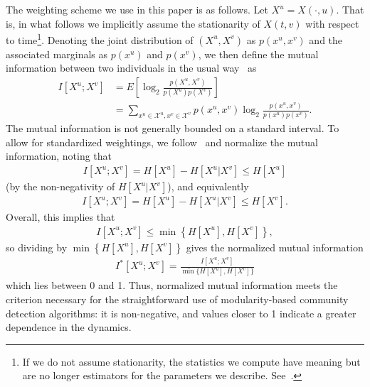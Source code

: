 \documentclass[12pt]{article}
\begin{document}
The weighting scheme we use in this paper is as follows. Let $X^{u} = X(\cdot, u).$ That is, in what follows we implicitly assume the stationarity of $X(t, v)$ with respect to time\footnote{If we do not assume stationarity, the statistics we compute have meaning but are no longer estimators for the parameters we describe. See~\cite{vu2009information}.}. Denoting the joint distribution of $(X^{u}, X^{v})$ as $p(x^{u}, x^{v})$ and the associated marginals as $p(x^{u})$ and $p(x^{v})$, we then define the mutual information between two individuals in the usual way~\cite{cover2012elements} as
\begin{align}
	I[X^{u}; X^{v}] &= E\left[\log_{2} \frac{p(X^{u}, X^{v})}{p(X^{u})p(X^{v})}\right]\\
	&= \sum_{x^{u} \in \mathcal{X}^{u}, x^{v} \in \mathcal{X}^{v}} p(x^{u}, x^{v}) \log_{2} \frac{p(x^{u}, x^{v})}{p(x^{u}) p(x^{v})}.
\end{align}
The mutual information is not generally bounded on a standard interval. To allow for standardized weightings, we follow~\cite{shalizi2007discovering} and normalize the mutual information, noting that
\begin{align}
	I[X^{u}; X^{v}] = H[X^{u}] - H[X^{u} | X^{v}] \leq H[X^{u}]
\end{align}
(by the non-negativity of $H[X^{u} | X^{v}]$), and equivalently
\begin{align}
	I[X^{u}; X^{v}] = H[X^{u}] - H[X^{u} | X^{v}] \leq H[X^{v}].
\end{align}
Overall, this implies that
\begin{align}
	I[X^{u}; X^{v}] \leq \min \left\{ H[X^{u}], H[X^{v}]\right\},
\end{align}
so dividing by $\min \left\{ H[X^{u}], H[X^{v}]\right\}$ gives the normalized mutual information
\begin{align}
	I^{*}[X^{u}; X^{v}] = \frac{I[X^{u}; X^{v}]}{\min \{ H[X^{u}], H[X^{v}]\}} \label{normalized-MI}
\end{align}
which lies between 0 and 1. Thus, normalized mutual information meets the criterion necessary for the straightforward use of modularity-based community detection algorithms: it is non-negative, and values closer to 1 indicate a greater dependence in the dynamics.
\end{document}
